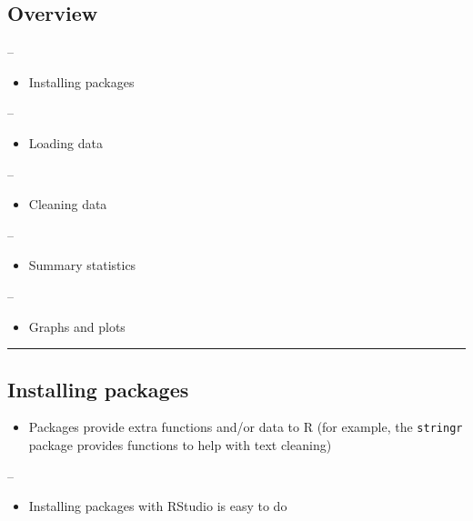 \documentclass[]{article}
\providecommand{\tightlist}{%
  \setlength{\itemsep}{0pt}\setlength{\parskip}{0pt}}
\begin{document}
\hypertarget{overview}{%
\subsection{Overview}\label{overview}}

--

\begin{itemize}
\tightlist
\item
  Installing packages
\end{itemize}

--

\begin{itemize}
\tightlist
\item
  Loading data
\end{itemize}

--

\begin{itemize}
\tightlist
\item
  Cleaning data
\end{itemize}

--

\begin{itemize}
\tightlist
\item
  Summary statistics
\end{itemize}

--

\begin{itemize}
\tightlist
\item
  Graphs and plots
\end{itemize}

\begin{center}\rule{0.5\linewidth}{\linethickness}\end{center}

\hypertarget{installing-packages}{%
\subsection{Installing packages}\label{installing-packages}}

\begin{itemize}
\tightlist
\item
  Packages provide extra functions and/or data to R (for example, the
  \texttt{stringr} package provides functions to help with text
  cleaning)
\end{itemize}

--

\begin{itemize}
\tightlist
\item
  Installing packages with RStudio is easy to do
\end{itemize}
\end{document}
